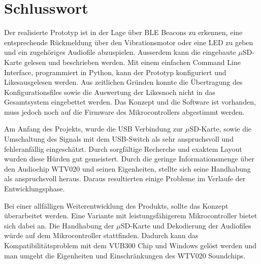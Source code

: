 \chapter{Schlusswort}
\label{Schlusswort}
\thispagestyle{fancy}  

Der realisierte Prototyp ist in der Lage über BLE Beacons zu erkennen, eine entsprechende Rückmeldung über den Vibrationsmotor oder eine LED zu geben und ein zugehöriges Audiofile abzuspielen. Ausserdem kann die eingebaute $\mu$SD-Karte gelesen und beschrieben werden. Mit einem einfachen Command Line Interface, programmiert in Python, kann der Prototyp konfiguriert und \flq Likes\frq ausgelesen werden. Aus zeitlichen Gründen konnte die Übertragung des Konfigurationsfiles sowie die Auswertung der \flq Likes\frq noch nicht in das Gesamtsystem eingebettet werden. Das Konzept und die Software ist vorhanden, muss jedoch noch auf die Firmware des Mikrocontrollers abgestimmt werden.

Am Anfang des Projekts, wurde die USB Verbindung zur $\mu$SD-Karte, sowie die Umschaltung des Signals mit dem USB-Switch als sehr anspruchsvoll und fehleranfällig eingeschätzt. Durch sorgfältige Recherche und exaktem Layout wurden diese Hürden gut gemeistert. Durch die geringe Informationsmenge über den Audiochip WTV020 und seinen Eigenheiten, stellte sich seine Handhabung als anspruchsvoll heraus. Daraus resultierten einige Probleme im Verlaufe der Entwicklungsphase.

Bei einer allfälligen Weiterentwicklung des Produkts, sollte das Konzept überarbeitet werden. Eine Variante mit leistungsfähigerem Mikrocontroller bietet sich dabei an. Die Handhabung der $\mu$SD-Karte und Dekodierung der Audiofiles würde auf dem Mikrocontroller stattfinden. Dadurch kann das Kompatibilitätsproblem mit dem VUB300 Chip und Windows gelöst werden und man umgeht die Eigenheiten und Einschränkungen des WTV020 Soundchips.
